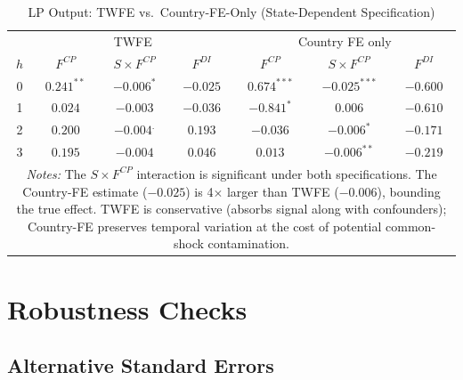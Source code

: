 \documentclass[12pt, a4paper]{article}
\begin{document}
\begin{table}[htbp]
\centering
\caption{LP Output: TWFE vs.\ Country-FE-Only (State-Dependent Specification)}
\label{tab:lp_fe_compare}
\small
\begin{tabular}{ccccccc}
\toprule
 & \multicolumn{3}{c}{TWFE} & \multicolumn{3}{c}{Country FE only} \\
$h$ & $F^{CP}$ & $S \times F^{CP}$ & $F^{DI}$ & $F^{CP}$ & $S \times F^{CP}$ & $F^{DI}$ \\
\midrule
0 & $0.241^{**}$ & $-0.006^{*}$  & $-0.025$ & $0.674^{***}$ & $-0.025^{***}$ & $-0.600$ \\
1 & $0.024$      & $-0.003$      & $-0.036$ & $-0.841^{*}$  & $0.006$        & $-0.610$ \\
2 & $0.200$      & $-0.004^{.}$  & $0.193$  & $-0.036$      & $-0.006^{*}$   & $-0.171$ \\
3 & $0.195$      & $-0.004$      & $0.046$  & $0.013$       & $-0.006^{**}$  & $-0.219$ \\
\bottomrule
\multicolumn{7}{p{13cm}}{\footnotesize \textit{Notes:} The $S \times F^{CP}$ interaction is significant under both specifications. The Country-FE estimate ($-0.025$) is 4$\times$ larger than TWFE ($-0.006$), bounding the true effect. TWFE is conservative (absorbs signal along with confounders); Country-FE preserves temporal variation at the cost of potential common-shock contamination.} \\
\end{tabular}
\end{table}


\section{Robustness Checks}
\label{app:robustness}

\subsection{Alternative Standard Errors}
\end{document}
